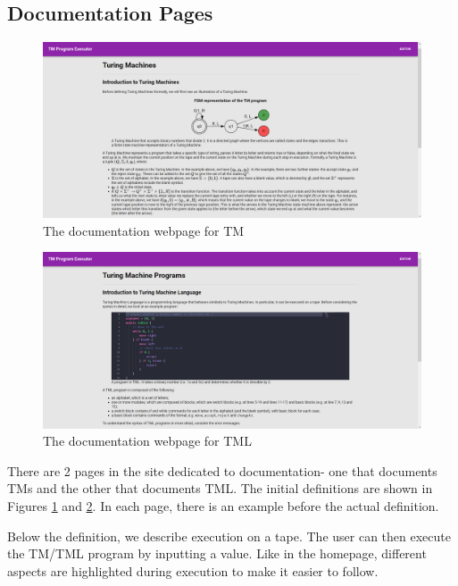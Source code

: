 \begin{appendices}
\section{Documentation Pages}
\begin{figure}[htb]
    \centering
    \includegraphics[scale=0.18]{images/Documentation for TM.png}
    \caption{The documentation webpage for TM}
    \label{fig:documentation_tm}
\end{figure}

\begin{figure}[htb]
    \centering
    \includegraphics[scale=0.18]{images/Documentation for TML.png}
    \caption{The documentation webpage for TML}
    \label{fig:documentation_tml}
\end{figure}

There are 2 pages in the site dedicated to documentation- one that documents TMs and the other that documents TML. The initial definitions are shown in Figures \ref{fig:documentation_tm} and \ref{fig:documentation_tml}. In each page, there is an example before the actual definition. 

Below the definition, we describe execution on a tape. The user can then execute the TM/TML program by inputting a value. Like in the homepage, different aspects are highlighted during execution to make it easier to follow.


\end{appendices}
